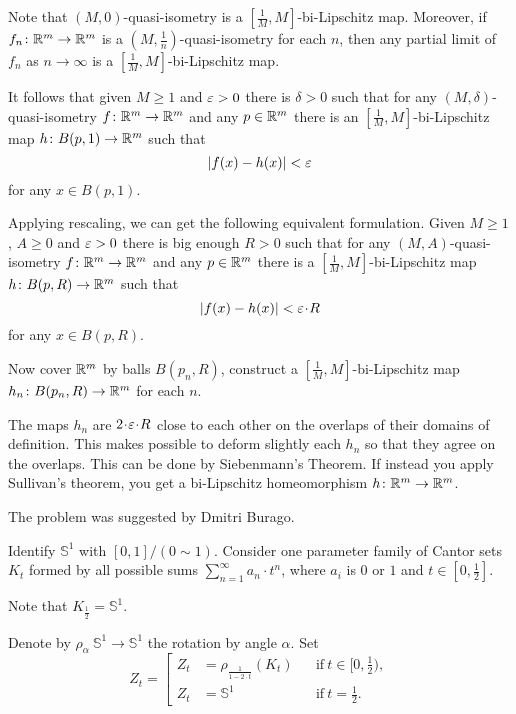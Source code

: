 {\sloppy
Note that $(M,0)$-quasi-isometry is a $[\tfrac1M,M]$-bi-Lipschitz map.
Moreover,
if $f_n\colon\mathbb{R}^m\to\mathbb{R}^m$ is a  $(M,\frac1n)$-quasi-isometry 
for each $n$, 
then any partial limit of $f_n$ as $n\to\infty$
is a $[\tfrac1M,M]$-bi-Lipschitz map.

}

It follows that given $M\ge 1$ and $\varepsilon>0$ there is $\delta>0$ such that 
for any $(M,\delta)$-quasi-isometry $f\colon\mathbb{R}^m\to\mathbb{R}^m$ and any $p\in \mathbb{R}^m$
there is an $[\tfrac1M,M]$-bi-Lipschitz map $h\colon B(p,1)\to \mathbb{R}^m$
such that
\[|f(x)-h(x)|<\varepsilon\]
for any $x\in B(p,1)$.

Applying rescaling, we can get the following equivalent formulation. 
Given $M\ge 1$, $A\ge 0$ and $\varepsilon>0$
there is big enough $R>0$ such that for any $(M,A)$-quasi-isometry 
$f\colon\mathbb{R}^m\to\mathbb{R}^m$ and any $p\in\mathbb{R}^m$ there is a $[\tfrac1M,M]$-bi-Lipschitz map $h\colon B(p,R)\to \mathbb{R}^m$
such that 
\[|f(x)-h(x)|<\eps\cdot R\]
for any $x\in B(p,R)$.

Now cover $\mathbb{R}^m$ by balls
$B(p_n,R)$, construct a $[\tfrac1M,M]$-bi-Lipschitz map $h_n\colon B(p_n,R)\to \mathbb{R}^m$ for each $n$.

The maps $h_n$ are $2\cdot \eps\cdot R$ close to each other on the overlaps of their domains of definition.
This makes possible to deform slightly each $h_n$ so that they agree on the overlaps.
This can be done by Siebenmann's Theorem.
If instead you apply Sullivan's theorem, you get a bi-Lipschitz homeomorphism $h\colon\mathbb{R}^m\to\mathbb{R}^m$.\qeds


The problem was suggested by Dmitri Burago.





Identify $\mathbb{S}^1$ with $[0,1]/(0\sim 1)$.
Consider one parameter family of Cantor sets $K_t$
formed by all possible sums $\sum_{n=1}^\infty a_n\cdot t^n$,
where $a_i$ is $0$ or $1$ and $t\in[0,\tfrac12]$.

Note that $K_{\frac12}=\mathbb{S}^1$.

Denote by $\rho_\alpha\:\mathbb{S}^1\to\mathbb{S}^1$ 
the rotation by angle $\alpha$.
Set 
\[Z_t=\left[\begin{aligned}
             Z_t&=\rho_{\frac1{1-2\cdot t}}(K_t)&&\text{if}\ t\in[0,\tfrac12),
\\
Z_{t}&=\mathbb{S}^1&&\text{if}\ t=\tfrac12.
            \end{aligned}
\right.
\]


